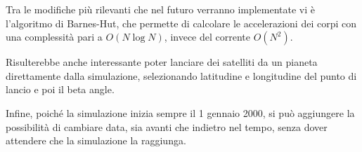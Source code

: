 \documentclass[11pt]{article}
\begin{document}
	Tra le modifiche più rilevanti che nel futuro verranno implementate vi è l'algoritmo di Barnes-Hut, che permette di calcolare le accelerazioni dei corpi con una complessità pari a $O(N\log{N})$, invece del corrente $O(N^2)$.

	Risulterebbe anche interessante poter lanciare dei satelliti da un pianeta direttamente dalla simulazione, selezionando latitudine e longitudine del punto di lancio e poi il beta angle.

	Infine, poiché la simulazione inizia sempre il 1 gennaio 2000, si può aggiungere la possibilità di cambiare data, sia avanti che indietro nel tempo, senza dover attendere che la simulazione la raggiunga.

	\printbibliography
\end{document}
